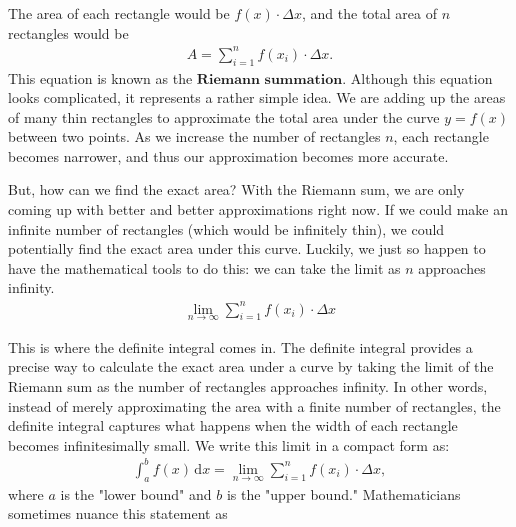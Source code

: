 The area of each rectangle would be $f(x) \cdot \Delta x$, and the total area of $n$ rectangles would be \begin{align*}
    A = \sum_{i = 1}^n f\left(x_i\right) \cdot \Delta x.
\end{align*}
This equation is known as the $\textbf{Riemann summation}$. Although this equation looks complicated, it represents a rather simple idea. We are adding up the areas of many thin rectangles to approximate the total area under the curve $y = f(x)$ between two points. As we increase the number of rectangles $n$, each rectangle becomes narrower, and thus our approximation becomes more accurate. \par

But, how can we find the exact area? With the Riemann sum, we are only coming up with better and better approximations right now. If we could make an infinite number of rectangles (which would be infinitely thin), we could potentially find the exact area under this curve. Luckily, we just so happen to have the mathematical tools to do this: we can take the limit as $n$ approaches infinity. \begin{align*}
    \lim_{n \to \infty} \sum_{i = 1}^n f\left(x_i\right) \cdot \Delta x
\end{align*}

This is where the definite integral comes in. The definite integral provides a precise way to calculate the exact area under a curve by taking the limit of the Riemann sum as the number of rectangles approaches infinity. In other words, instead of merely approximating the area with a finite number of rectangles, the definite integral captures what happens when the width of each rectangle becomes infinitesimally small. We write this limit in a compact form as: \begin{align*}
    \int_a^b f(x) \,\mathrm{d}x = \lim_{n \to \infty} \sum_{i = 1}^n f\left(x_i\right) \cdot \Delta x,
\end{align*}
where $a$ is the "lower bound" and $b$ is the "upper bound." Mathematicians sometimes nuance this statement as \par

\begin{center}
\end{center}
